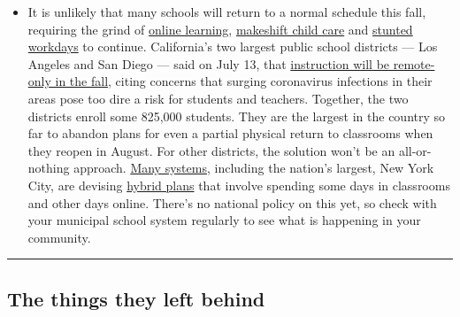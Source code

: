 \begin{itemize}
  \begin{itemize}
  \tightlist
  \item
    It is unlikely that many schools will return to a normal schedule
    this fall, requiring the grind of
    \href{https://www.nytimes3xbfgragh.onion/2020/06/05/us/coronavirus-education-lost-learning.html?action=click\&pgtype=Article\&state=default\&region=MAIN_CONTENT_3\&context=storylines_faq}{online
    learning},
    \href{https://www.nytimes3xbfgragh.onion/2020/05/29/us/coronavirus-child-care-centers.html?action=click\&pgtype=Article\&state=default\&region=MAIN_CONTENT_3\&context=storylines_faq}{makeshift
    child care} and
    \href{https://www.nytimes3xbfgragh.onion/2020/06/03/business/economy/coronavirus-working-women.html?action=click\&pgtype=Article\&state=default\&region=MAIN_CONTENT_3\&context=storylines_faq}{stunted
    workdays} to continue. California's two largest public school
    districts --- Los Angeles and San Diego --- said on July 13, that
    \href{https://www.nytimes3xbfgragh.onion/2020/07/13/us/lausd-san-diego-school-reopening.html?action=click\&pgtype=Article\&state=default\&region=MAIN_CONTENT_3\&context=storylines_faq}{instruction
    will be remote-only in the fall}, citing concerns that surging
    coronavirus infections in their areas pose too dire a risk for
    students and teachers. Together, the two districts enroll some
    825,000 students. They are the largest in the country so far to
    abandon plans for even a partial physical return to classrooms when
    they reopen in August. For other districts, the solution won't be an
    all-or-nothing approach.
    \href{https://bioethics.jhu.edu/research-and-outreach/projects/eschool-initiative/school-policy-tracker/}{Many
    systems}, including the nation's largest, New York City, are
    devising
    \href{https://www.nytimes3xbfgragh.onion/2020/06/26/us/coronavirus-schools-reopen-fall.html?action=click\&pgtype=Article\&state=default\&region=MAIN_CONTENT_3\&context=storylines_faq}{hybrid
    plans} that involve spending some days in classrooms and other days
    online. There's no national policy on this yet, so check with your
    municipal school system regularly to see what is happening in your
    community.
  \end{itemize}
\end{itemize}

\begin{center}\rule{0.5\linewidth}{\linethickness}\end{center}

\hypertarget{the-things-they-left-behind}{%
\subsection{The things they left
behind}\label{the-things-they-left-behind}}

